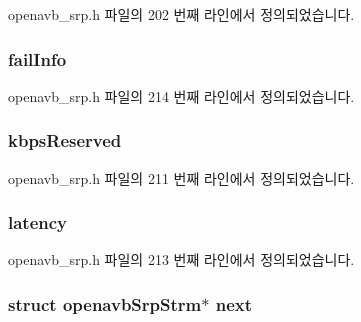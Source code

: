 openavb\+\_\+srp.\+h 파일의 202 번째 라인에서 정의되었습니다.

\subsubsection[{\texorpdfstring{fail\+Info}{failInfo}}]{ fail\+Info}\hypertarget{structopenavb_srp_strm_ababc5c648c7af6384d778794cf8a1780}{}\label{structopenavb_srp_strm_ababc5c648c7af6384d778794cf8a1780}


openavb\+\_\+srp.\+h 파일의 214 번째 라인에서 정의되었습니다.

\subsubsection[{\texorpdfstring{kbps\+Reserved}{kbpsReserved}}]{ kbps\+Reserved}\hypertarget{structopenavb_srp_strm_a0834846e1536a8edd920e77536a9acaf}{}\label{structopenavb_srp_strm_a0834846e1536a8edd920e77536a9acaf}


openavb\+\_\+srp.\+h 파일의 211 번째 라인에서 정의되었습니다.

\subsubsection[{\texorpdfstring{latency}{latency}}]{ latency}\hypertarget{structopenavb_srp_strm_ae16309c230017ae952e8a54441556efc}{}\label{structopenavb_srp_strm_ae16309c230017ae952e8a54441556efc}


openavb\+\_\+srp.\+h 파일의 213 번째 라인에서 정의되었습니다.

\subsubsection[{\texorpdfstring{next}{next}}]{\setlength{\rightskip}{0pt plus 5cm}struct {\bf openavb\+Srp\+Strm}$\ast$ next}\hypertarget{structopenavb_srp_strm_ae0b5dd5717d4dade7a41eaddee71905b}{}\label{structopenavb_srp_strm_ae0b5dd5717d4dade7a41eaddee71905b}


